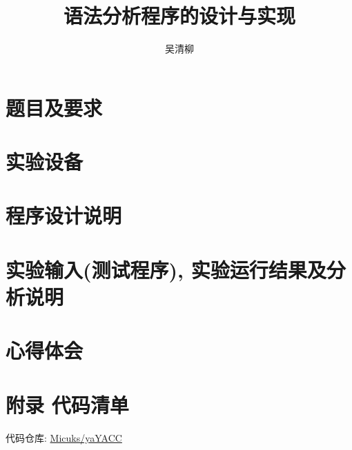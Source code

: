 \documentclass[12pt, twoside]{article}
\title{语法分析程序的设计与实现}
\author{\textup{吴清柳}}
\begin{document}

\tableofcontents
\newpage

\pagestyle{fancy}
\fancyhead{} %
\fancyfoot{} %
\fancyfoot[CE, CO]{\thepage}

\section{题目及要求}

\section{实验设备}

\section{程序设计说明}

\section{实验输入(测试程序), 实验运行结果及分析说明}

\section{心得体会}

\section{附录 代码清单}

代码仓库: \href{https://github.com/Micuks/yaYACC}{Micuks/yaYACC}

% 
% 
\end{document}
